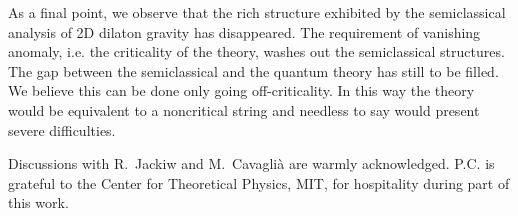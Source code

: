 \documentclass[a4paper,aps,prd,twocolumn,groupedaddress]{revtex4}
\begin{document}
As a final point, we observe that the rich structure exhibited by the
semiclassical analysis of 2D dilaton gravity has disappeared.
The requirement of vanishing
anomaly, i.e. the criticality of the theory, washes out the
semiclassical structures. The gap between the semiclassical and the
quantum theory   has still to be filled. We believe this
can be done only going off-criticality. In this way the theory would be
equivalent to a noncritical string and needless to say would present
severe difficulties.



\begin{acknowledgments}
Discussions with R.~Jackiw and M.~Cavagli\`a are warmly
acknowledged. P.C. is grateful to the Center for Theoretical Physics,
MIT, for hospitality during part of this work.
\end{acknowledgments}
\end{document}
